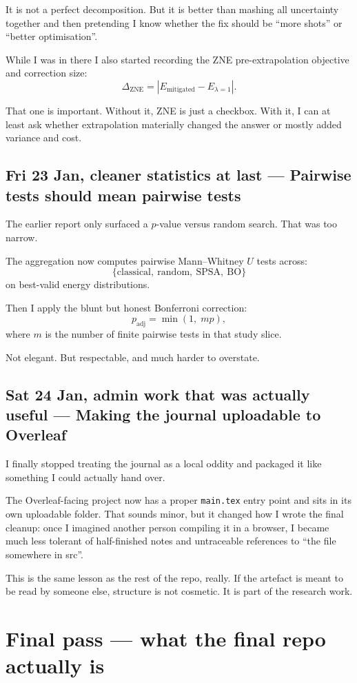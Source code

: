 \documentclass[11pt]{article}
\newcommand{\entry}[2]{\subsection*{#1 --- #2}}
\newcommand{\repo}[1]{\texttt{#1}}
\begin{document}
It is not a perfect decomposition.
But it is better than mashing all uncertainty together and then pretending I know whether the fix
should be ``more shots'' or ``better optimisation''.

While I was in there I also started recording the ZNE pre-extrapolation objective and correction size:
\[
\Delta_{\text{ZNE}}
=
\left|E_{\text{mitigated}} - E_{\lambda=1}\right|.
\]

That one is important.
Without it, ZNE is just a checkbox.
With it, I can at least ask whether extrapolation materially changed the answer or mostly added
variance and cost.

\entry{Fri 23 Jan, cleaner statistics at last}{Pairwise tests should mean pairwise tests}

The earlier report only surfaced a \(p\)-value versus random search.
That was too narrow.

The aggregation now computes pairwise Mann--Whitney \(U\) tests across:
\[
\{\text{classical},\ \text{random},\ \text{SPSA},\ \text{BO}\}
\]
on best-valid energy distributions.

Then I apply the blunt but honest Bonferroni correction:
\[
p_{\text{adj}} = \min(1,\; m p),
\]
where \(m\) is the number of finite pairwise tests in that study slice.

Not elegant.
But respectable, and much harder to overstate.

\entry{Sat 24 Jan, admin work that was actually useful}{Making the journal uploadable to Overleaf}

I finally stopped treating the journal as a local oddity and packaged it like something I could
actually hand over.

The Overleaf-facing project now has a proper
\repo{main.tex}
entry point and sits in its own uploadable folder.
That sounds minor, but it changed how I wrote the final cleanup:
once I imagined another person compiling it in a browser, I became much less tolerant of half-finished
notes and untraceable references to ``the file somewhere in src''.

This is the same lesson as the rest of the repo, really.
If the artefact is meant to be read by someone else, structure is not cosmetic.
It is part of the research work.

\section*{Final pass --- what the final repo actually is}
\end{document}
